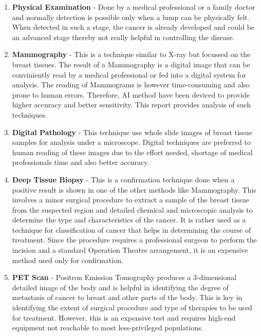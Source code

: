 \documentclass[sigconf, language=english]{acmart}
\begin{document}
\begin{enumerate}
\item \textbf{Physical Examination} - Done by a medical professional or a family doctor and normally detection is possible only when a lump can be physically felt. When detected in such a stage, the cancer is already developed and could be an advanced stage thereby not really helpful in controlling the disease.

\item \textbf{Mammography} - This is a technique similar to X-ray but focussed on the breast tissues. The result of a Mammography is a digital image that can be conviniently read by a medical professional or fed into a digital system for analysis. The reading of Mammograms is however time-consuming and also prone to human errors. Therefore, AI method have been deviced to provide higher accuracy and better sensitivity. This report provides analysis of such techniques.

\item \textbf{Digital Pathology} - This technique use whole slide images of breast tissue samples for analysis under a microscope. Digital techniques are preferred to human reading of these images due to the effort needed, shortage of medical professionals time and also better accuracy.

\item \textbf{Deep Tissue Biopsy} - This is a confirmation technique done when a positive result is shown in one of the other methods like Mammography. This involves a minor surgical procedure to extract a sample of the breast tissue from the suspected region and detailed chemical and microscopic analysis to determine the type and characteristics of the cancer. It is rather used as a technique for classification of cancer that helps in determining the course of treatment. Since the procedure requires a professional surgeon to perform the incision and a standard Operation Theatre arrangement, it is an expensive method used only for confirmation.

\item \textbf{PET Scan} - Positron Emission Tomography produces a 3-dimensional detailed image of the body and is helpful in identifying the degree of metastasis of cancer to breast and other parts of the body. This is key in identifying the extent of surgical procedure and type of therapies to be used for treatment. However, this is an expensive test and requires high-end equipment not reachable to most less-privileged populations.

\end{enumerate}
\end{document}
